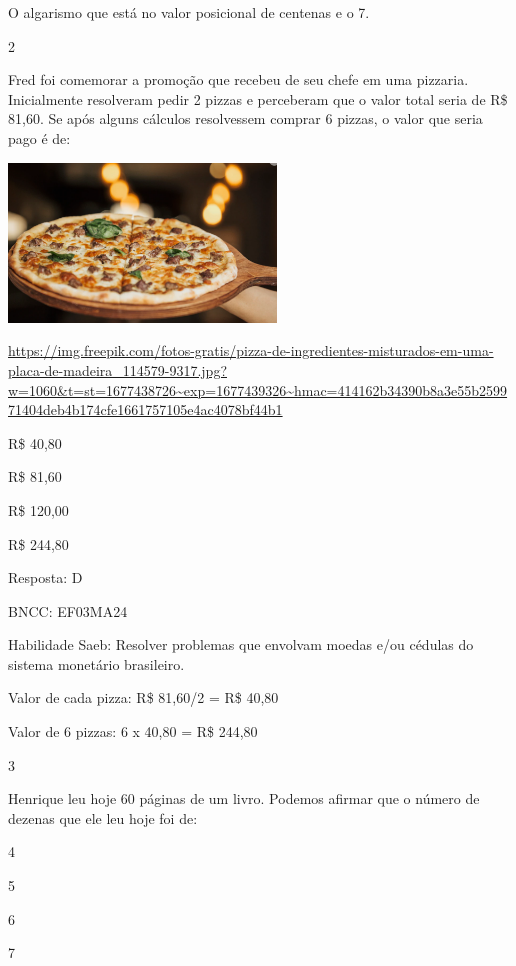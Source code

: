 \begin{escolha}
O algarismo que está no valor posicional de centenas e o 7.

\num{2}

Fred foi comemorar a promoção que recebeu de seu chefe em uma pizzaria.
Inicialmente resolveram pedir 2 pizzas e perceberam que o valor total
seria de R\$ 81,60. Se após alguns cálculos resolvessem comprar 6
pizzas, o valor que seria pago é de:

\includegraphics[width=2.80000in,height=1.66867in]{media/image131.png}

\url{https://img.freepik.com/fotos-gratis/pizza-de-ingredientes-misturados-em-uma-placa-de-madeira_114579-9317.jpg?w=1060\&t=st=1677438726~exp=1677439326~hmac=414162b34390b8a3e55b259971404deb4b174cfe1661757105e4ac4078bf44b1}

\begin{escolha}

\item
  R\$ 40,80
\item
  R\$ 81,60
\item
  R\$ 120,00
\item
  R\$ 244,80
\end{escolha}

Resposta: D

BNCC: EF03MA24

Habilidade Saeb: Resolver problemas que envolvam moedas e/ou cédulas do
sistema monetário brasileiro.

Valor de cada pizza: R\$ 81,60/2 = R\$ 40,80

Valor de 6 pizzas: 6 x 40,80 = R\$ 244,80

\num{3}

Henrique leu hoje 60 páginas de um livro. Podemos afirmar que o número
de dezenas que ele leu hoje foi de:

\begin{escolha}

\item
  4
\item
  5
\item
  6
\item
  7
\end{escolha}


\end{escolha}
